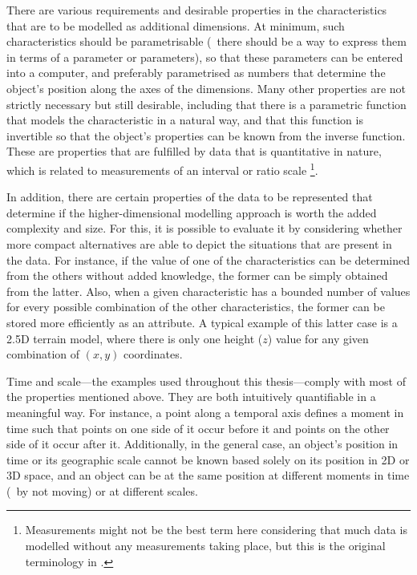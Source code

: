 There are various requirements and desirable properties in the characteristics that are to be modelled as additional dimensions.
At minimum, such characteristics should be parametrisable (\ie\ there should be a way to express them in terms of a parameter or parameters), so that these parameters can be entered into a computer, and preferably parametrised as numbers that determine the object's position along the axes of the dimensions.
Many other properties are not strictly necessary but still desirable, including that there is a parametric function that models the characteristic in a natural way, and that this function is invertible so that the object's properties can be known from the inverse function.
These are properties that are fulfilled by data that is quantitative in nature, which is related to measurements of an interval or ratio scale \citep{Stevens46}\footnote{Measurements might not be the best term here considering that much data is modelled without any measurements taking place, but this is the original terminology in \citet{Stevens46}.}.

In addition, there are certain properties of the data to be represented that determine if the higher-dimensional modelling approach is worth the added complexity and size.
For this, it is possible to evaluate it by considering whether more compact alternatives are able to depict the situations that are present in the data.
For instance, if the value of one of the characteristics can be determined from the others without added knowledge, the former can be simply obtained from the latter.
Also, when a given characteristic has a bounded number of values for every possible combination of the other characteristics, the former can be stored more efficiently as an attribute.
A typical example of this latter case is a 2.5D terrain model, where there is only one height ($z$) value for any given combination of $(x,y)$ coordinates.

Time and scale---the examples used throughout this thesis---comply with most of the properties mentioned above.
They are both intuitively quantifiable in a meaningful way.
For instance, a point along a temporal axis defines a moment in time such that points on one side of it occur before it and points on the other side of it occur after it.
Additionally, in the general case, an object's position in time or its geographic scale cannot be known based solely on its position in 2D or 3D space, and an object can be at the same position at different moments in time (\eg\ by not moving) or at different scales.

